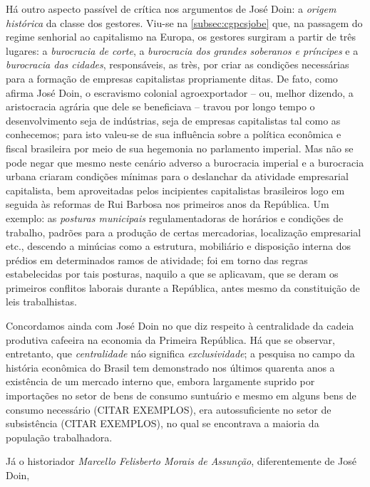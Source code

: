 Há outro aspecto passível de crítica nos argumentos de José Doin: a \textit{origem histórica} da classe dos gestores. Viu-se na \autoref{subsec:cgpcsjobe} que, na passagem do regime senhorial ao capitalismo na Europa, os gestores surgiram a partir de três lugares: a \textit{burocracia de corte}, a \textit{burocracia dos grandes soberanos e príncipes} e a \textit{burocracia das cidades}, responsáveis, as très, por criar as condições necessárias para a formação de empresas capitalistas propriamente ditas. De fato, como afirma José Doin, o escravismo colonial agroexportador -- ou, melhor dizendo, a aristocracia agrária que dele se beneficiava -- travou por longo tempo o desenvolvimento seja de indústrias, seja de empresas capitalistas tal como as conhecemos; para isto valeu-se de sua influência sobre a política econômica e fiscal brasileira por meio de sua hegemonia no parlamento imperial. Mas não se pode negar que mesmo neste cenário adverso a burocracia imperial e a burocracia urbana criaram condições mínimas para o deslanchar da atividade empresarial capitalista, bem aproveitadas pelos incipientes capitalistas brasileiros logo em seguida às reformas de Rui Barbosa nos primeiros anos da República. Um exemplo: as \textit{posturas municipais} regulamentadoras de horários e condições de trabalho, padrões para a produção de certas mercadorias, localização empresarial etc., descendo a minúcias como a estrutura, mobiliário e disposição interna dos prédios em determinados ramos de atividade; foi em torno das regras estabelecidas por tais posturas, naquilo a que se aplicavam, que se deram os primeiros conflitos laborais durante a República, antes mesmo da constituição de leis trabalhistas. 

Concordamos ainda com José Doin no que diz respeito à centralidade da cadeia produtiva cafeeira na economia da Primeira República. Há que se observar, entretanto, que \textit{centralidade} náo significa \textit{exclusividade}; a pesquisa no campo da história econômica do Brasil tem demonstrado nos últimos quarenta anos a existência de um mercado interno que, embora largamente suprido por importações no setor de bens de consumo suntuário e mesmo em alguns bens de consumo necessário (CITAR EXEMPLOS), era autossuficiente no setor de subsistência (CITAR EXEMPLOS), no qual se encontrava a maioria da população trabalhadora.

Já o historiador \textit{Marcello Felisberto Morais de Assunção}, diferentemente de José Doin, 